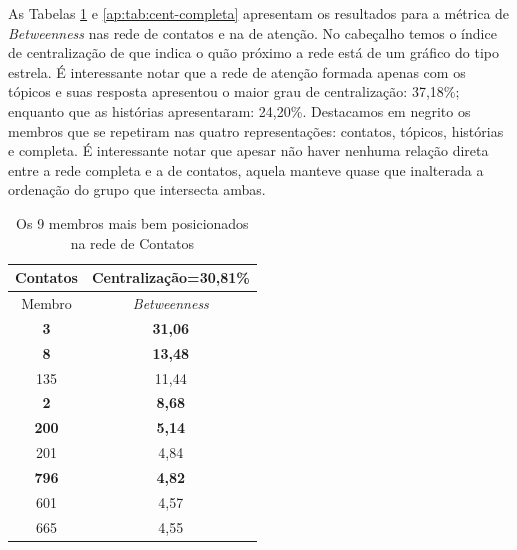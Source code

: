 As Tabelas \ref{ap:tab:cent-contatos} e \ref{ap:tab:cent-completa} apresentam os
resultados para a métrica de \emph{Betweenness} nas rede de contatos e na de
atenção. No cabeçalho temos o índice de centralização de
\citeauthor{Freeman1979} que indica o quão próximo a rede está de um gráfico do
tipo estrela. É interessante notar que a rede de atenção formada apenas com os
tópicos e suas resposta apresentou o maior grau de centralização: 37,18\%;
enquanto que as histórias apresentaram: 24,20\%. Destacamos em negrito os
membros que se repetiram nas quatro representações: contatos, tópicos, histórias
e completa. É interessante notar que apesar não haver nenhuma relação direta
entre a rede completa e a de contatos, aquela manteve quase que inalterada a
ordenação do grupo que intersecta ambas.

\begin{table}[htbp]
	\setlength{\arrayrulewidth}{2\arrayrulewidth}  %
	\setlength{\belowcaptionskip}{10pt}  %
	\caption{Os 9 membros mais bem posicionados na rede de Contatos} \centering   
	\begin{tabular}{| c | c |}
	\hline
	Contatos & Centralização=30,81\% \\ \hline\hline
	Membro & \emph{Betweenness} \\ \hline
	\textbf{3} & \textbf{31,06} \\
	\textbf{8} & \textbf{13,48} \\
	135 & 11,44 \\
	\textbf{2} & \textbf{8,68} \\
	\textbf{200} & \textbf{5,14} \\
	201 & 4,84 \\
	\textbf{796} & \textbf{4,82} \\
	601 & 4,57 \\
	665 & 4,55 \\ \hline
	\end{tabular}
	\label{ap:tab:cent-contatos}
\end{table}

